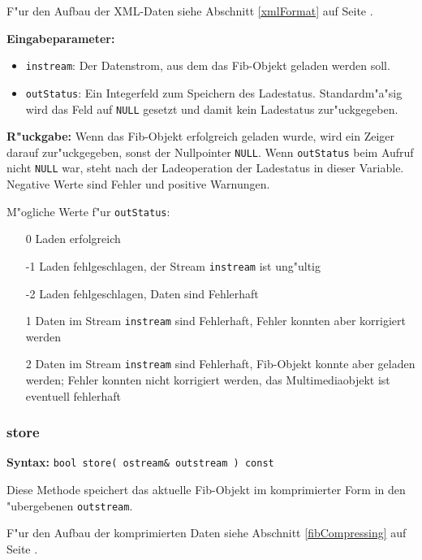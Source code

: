 F"ur den Aufbau der XML-Daten siehe Abschnitt \ref{xmlFormat} auf Seite \pageref{xmlFormat}.

\bigskip\noindent
\textbf{Eingabeparameter:}
\begin{itemize}
 \item \verb|instream|: Der Datenstrom, aus dem das Fib-Objekt geladen werden soll.
 \item \verb|outStatus|: Ein Integerfeld zum Speichern des Ladestatus. Standardm"a"sig wird das Feld auf \verb|NULL| gesetzt und damit kein Ladestatus zur"uckgegeben.
\end{itemize}

\bigskip\noindent
\textbf{R"uckgabe:} Wenn das Fib-Objekt erfolgreich geladen wurde, wird ein Zeiger darauf zur"uckgegeben, sonst der Nullpointer \verb|NULL|. Wenn \verb|outStatus| beim Aufruf nicht \verb|NULL| war, steht nach der Ladeoperation der Ladestatus in dieser Variable. Negative Werte sind Fehler und positive Warnungen.

\bigskip\noindent
M"ogliche Werte f"ur \verb|outStatus|:
\begin{itemize}
 \item[0] Laden erfolgreich
 \item[-1] Laden fehlgeschlagen, der Stream \verb|instream| ist ung"ultig
 \item[-2] Laden fehlgeschlagen, Daten sind Fehlerhaft
 \item[1] Daten im Stream \verb|instream| sind Fehlerhaft, Fehler konnten aber korrigiert werden
 \item[2] Daten im Stream \verb|instream| sind Fehlerhaft, Fib-Objekt konnte aber geladen werden; Fehler konnten nicht korrigiert werden, das Multimediaobjekt ist eventuell fehlerhaft
\end{itemize}



\subsubsection{store}

\textbf{Syntax:} \verb|bool store( ostream& outstream ) const|

\bigskip\noindent
Diese Methode speichert das aktuelle Fib-Objekt im komprimierter Form in den "ubergebenen \verb|outstream|.

F"ur den Aufbau der komprimierten Daten siehe Abschnitt \ref{fibCompressing} auf Seite \pageref{fibCompressing}.

